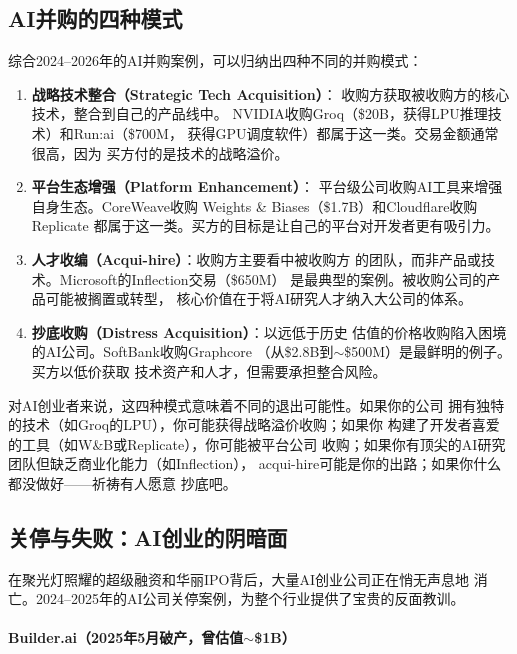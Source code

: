 \subsection{AI并购的四种模式}
\label{subsec:fund-ma-patterns}

综合2024--2026年的AI并购案例，可以归纳出四种不同的并购模式：

\begin{enumerate}
  \item \textbf{战略技术整合（Strategic Tech Acquisition）}：
    收购方获取被收购方的核心技术，整合到自己的产品线中。
    NVIDIA收购Groq（\$20B，获得LPU推理技术）和Run:ai（\$700M，
    获得GPU调度软件）都属于这一类。交易金额通常很高，因为
    买方付的是技术的战略溢价。

  \item \textbf{平台生态增强（Platform Enhancement）}：
    平台级公司收购AI工具来增强自身生态。CoreWeave收购
    Weights \& Biases（\$1.7B）和Cloudflare收购Replicate
    都属于这一类。买方的目标是让自己的平台对开发者更有吸引力。

  \item \textbf{人才收编（Acqui-hire）}：收购方主要看中被收购方
    的团队，而非产品或技术。Microsoft的Inflection交易（\$650M）
    是最典型的案例。被收购公司的产品可能被搁置或转型，
    核心价值在于将AI研究人才纳入大公司的体系。

  \item \textbf{抄底收购（Distress Acquisition）}：以远低于历史
    估值的价格收购陷入困境的AI公司。SoftBank收购Graphcore
    （从\$2.8B到$\sim$\$500M）是最鲜明的例子。买方以低价获取
    技术资产和人才，但需要承担整合风险。
\end{enumerate}

对AI创业者来说，这四种模式意味着不同的退出可能性。如果你的公司
拥有独特的技术（如Groq的LPU），你可能获得战略溢价收购；如果你
构建了开发者喜爱的工具（如W\&B或Replicate），你可能被平台公司
收购；如果你有顶尖的AI研究团队但缺乏商业化能力（如Inflection），
acqui-hire可能是你的出路；如果你什么都没做好——祈祷有人愿意
抄底吧。

\subsection{关停与失败：AI创业的阴暗面}
\label{subsec:fund-shutdowns}

在聚光灯照耀的超级融资和华丽IPO背后，大量AI创业公司正在悄无声息地
消亡。2024--2025年的AI公司关停案例，为整个行业提供了宝贵的反面教训。

\paragraph{Builder.ai（2025年5月破产，曾估值$\sim$\$1B）}

